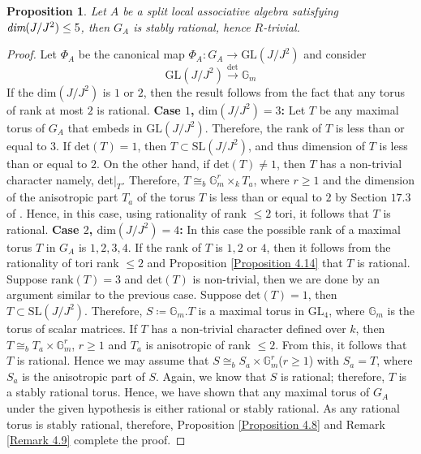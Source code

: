 \documentclass[12pt]{amsart}
\newtheorem{proposition}[theorem]{Proposition}
\theoremstyle{definition}
\numberwithin{equation}{section}
\begin{document}
\begin{proposition}\label{Proposition 4.15}
Let $A$ be a split local associative algebra satisfying $\emph{dim}(J/J^2)\leq 5$, then $G_A$ is stably rational, hence $R$-trivial.
\end{proposition}
\vskip1mm
\begin{proof}
Let $\Phi_A$ be the canonical map $\Phi_A:G_A\rightarrow \text{GL}(J/J^2)$ and consider 
\begin{equation*}\label{eq8}
\text{GL}(J/J^2)\xrightarrow{\text{det}} \mathbb{G}_m 
\end{equation*} 
If the $\text{dim}(J/J^2)$ is $1$ or $2$, then the result follows from the fact that any torus of rank at most $2$ is rational.
\vskip2mm
\noindent
\textbf{Case $1$, $\text{dim}(J/J^2)=3$:} Let $T$ be any maximal torus of $G_A$ that embeds in $\text{GL}(J/J^2)$. Therefore, the rank of $T$ is less than or equal to $3$. If $\text{det}(T)=1$, then $T\subset \text{SL}(J/J^2)$, and thus dimension of $T$ is less than or equal to $2$. On the other hand, if $\text{det}(T)\neq 1$, then $T$ has a non-trivial character namely, $\text{det}|_{T}$. Therefore, $T\cong_{b} \mathbb{G}_m^{r}\times_k T_a$, where $r\geq 1$ and the dimension of the anisotropic part $T_a$ of the torus $T$ is less than or equal to $2$ by Section $17.3$ of \cite{Voskrenskii}. Hence, in this case, using rationality of rank $\leq 2$ tori, it follows that $T$ is rational. 
\vskip2mm 
\noindent
\textbf{Case $2$, $\text{dim}(J/J^2)=4$:} In this case the possible rank of a maximal torus $T$ in $G_A$ is $1,2,3,4$. If the rank of $T$ is $ 1,2\text { or } 4$, then it follows from the rationality of tori rank $\leq 2$ and Proposition \ref{Proposition 4.14} that $T$ is rational. Suppose $\text{rank}(T)=3$ and $\text{det}(T)$ is non-trivial, then we are done by an argument similar to the previous case. Suppose $\text{det}(T)=1$, then $T\subset \text{SL}(J/J^2)$. Therefore, $S\coloneq \mathbb{G}_{m}.T$ is a maximal torus in $\text{GL}_{4}$, where $\mathbb{G}_m$ is the torus of scalar matrices. If $T$ has a non-trivial character defined over $k$, then $T\cong_b T_a\times \mathbb{G}_m^{r}$, $r\geq 1$ and $T_a$ is anisotropic of rank $\leq 2$. From this, it follows that $T$ is rational. Hence we may assume that $S\cong_b S_a \times \mathbb{G}_m^{r}$($r\geq 1$) with $S_a=T$, where $S_a$ is the anisotropic part of $S$. Again, we know that $S$ is rational; therefore, $T$ is a stably rational torus. Hence, we have shown that any maximal torus of $G_A$ under the given hypothesis is either rational or stably rational. As any rational torus is stably rational, therefore, Proposition \ref{Proposition 4.8} and Remark \ref{Remark 4.9} complete the proof.

\end{proof}
\end{document}
